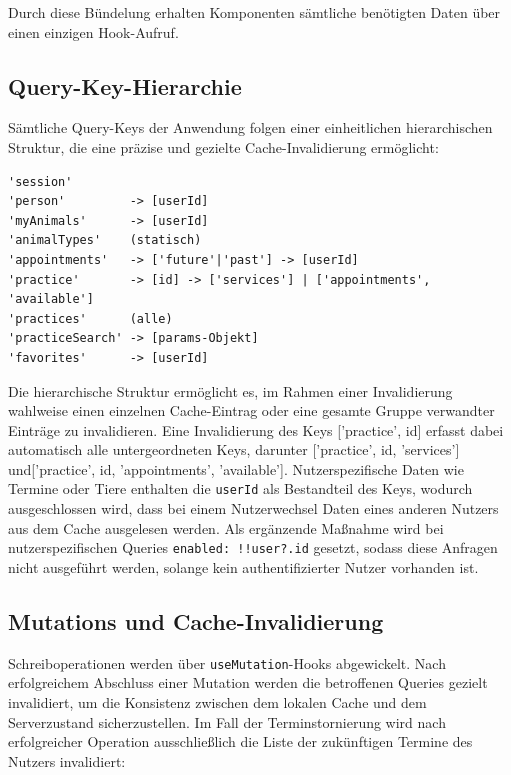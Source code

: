 Durch diese Bündelung erhalten Komponenten sämtliche benötigten Daten über einen einzigen Hook-Aufruf.

\subsection{Query-Key-Hierarchie}

Sämtliche Query-Keys der Anwendung folgen einer einheitlichen hierarchischen Struktur,
die eine präzise und gezielte Cache-Invalidierung ermöglicht:

\begin{listing}[H]
\begin{verbatim}
'session'
'person'         -> [userId]
'myAnimals'      -> [userId]
'animalTypes'    (statisch)
'appointments'   -> ['future'|'past'] -> [userId]
'practice'       -> [id] -> ['services'] | ['appointments', 'available']
'practices'      (alle)
'practiceSearch' -> [params-Objekt]
'favorites'      -> [userId]
\end{verbatim}
\caption{Query-Key-Hierarchie der Anwendung}
\label{lst:query-keys}
\end{listing}

Die hierarchische Struktur ermöglicht es, im Rahmen einer Invalidierung wahlweise einen
einzelnen Cache-Eintrag oder eine gesamte Gruppe verwandter Einträge zu invalidieren. Eine
Invalidierung des Keys ['practice', id] erfasst dabei automatisch alle untergeordneten Keys, darunter ['practice', id, 'services'] und['practice', id, 'appointments', 'available']. Nutzerspezifische Daten wie Termine
oder Tiere enthalten die \texttt{userId} als Bestandteil des Keys, wodurch ausgeschlossen wird, dass bei einem Nutzerwechsel Daten eines anderen Nutzers aus dem Cache ausgelesen werden. Als ergänzende Maßnahme wird bei nutzerspezifischen Queries \texttt{enabled: !!user?.id}
gesetzt, sodass diese Anfragen nicht ausgeführt werden, solange kein authentifizierter Nutzer vorhanden ist.

\subsection{Mutations und Cache-Invalidierung}

Schreiboperationen werden über \texttt{useMutation}-Hooks abgewickelt. Nach erfolgreichem Abschluss einer Mutation werden die betroffenen Queries gezielt invalidiert, um die Konsistenz zwischen dem lokalen Cache und dem Serverzustand sicherzustellen. Im Fall der Terminstornierung wird nach erfolgreicher Operation ausschließlich die Liste der
zukünftigen Termine des Nutzers invalidiert:

